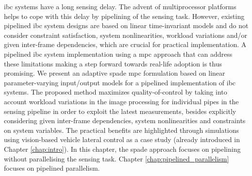 \Gls{ibc} systems have a long sensing delay. 
The advent of multiprocessor platforms helps to cope with this delay by pipelining of the sensing task.
However, existing pipelined \gls{ibc} system designs are based on linear time-invariant models and do not consider constraint satisfaction, system nonlinearities, workload variations and/or given inter-frame dependencies, which are crucial for practical implementation.
A pipelined \gls{ibc} system implementation using a \gls{mpc} approach that can address these limitations making a step forward towards real-life adoption is thus promising.
We present an adaptive \gls{spade} \gls{mpc} formulation based on linear parameter-varying input/output models for a pipelined implementation of \gls{ibc} systems.
The proposed method maximizes quality-of-control by taking into account workload variations in the image processing for individual pipes in the sensing pipeline in order to exploit the latest measurements,
besides explicitly considering given inter-frame dependencies, system nonlinearities and constraints on system variables. The practical benefits are highlighted through simulations using vision-based vehicle lateral control as a case study (already introduced in Chapter \ref{chap:intro}).
In this chapter, the \gls{spade} approach focuses on pipelining without parallelising the sensing task. 
Chapter \ref{chap:pipelined_parallelism} focuses on pipelined parallelism.